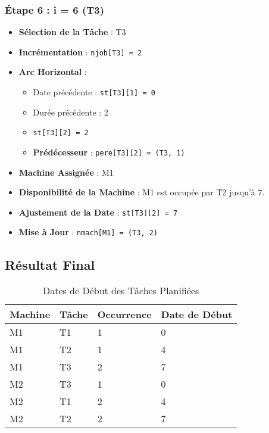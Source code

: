 \documentclass[12pt]{article}
\begin{document}
\subsubsection{Étape 6 : i = 6 (T3)}

\begin{itemize}
    \item \textbf{Sélection de la Tâche} : T3
    \item \textbf{Incrémentation} : \texttt{njob[T3] = 2}
    \item \textbf{Arc Horizontal} :
    \begin{itemize}
        \item Date précédente : \texttt{st[T3][1] = 0}
        \item Durée précédente : 2
        \item \texttt{st[T3][2] = 2}
        \item \textbf{Prédécesseur} : \texttt{pere[T3][2] = (T3, 1)}
    \end{itemize}
    \item \textbf{Machine Assignée} : M1
    \item \textbf{Disponibilité de la Machine} : M1 est occupée par T2 jusqu'à 7.
    \item \textbf{Ajustement de la Date} : \texttt{st[T3][2] = 7}
    \item \textbf{Mise à Jour} : \texttt{nmach[M1] = (T3, 2)}
\end{itemize}

\subsection{Résultat Final}

\begin{table}[h!]
\centering
\begin{tabular}{@{}llll@{}}
\toprule
\textbf{Machine} & \textbf{Tâche} & \textbf{Occurrence} & \textbf{Date de Début} \\ \midrule
M1 & T1 & 1 & 0 \\
M1 & T2 & 1 & 4 \\
M1 & T3 & 2 & 7 \\
M2 & T3 & 1 & 0 \\
M2 & T1 & 2 & 4 \\
M2 & T2 & 2 & 7 \\ \bottomrule
\end{tabular}
\caption{Dates de Début des Tâches Planifiées}
\end{table}
\end{document}
